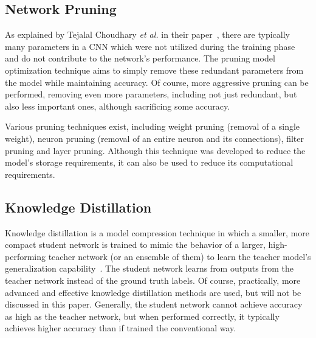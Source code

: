 \subsection{Network Pruning}

As explained by Tejalal Choudhary \textit{et al.} in their
paper~\cite{Choudhary2020}, there are typically many parameters in a CNN which
were not utilized during the training phase and do not contribute to the
network's performance. The pruning model optimization technique aims to simply
remove these redundant parameters from the model while maintaining accuracy. Of
course, more aggressive pruning can be performed, removing even more parameters,
including not just redundant, but also less important ones, although
sacrificing some accuracy.

Various pruning techniques exist, including weight pruning (removal of a single
weight), neuron pruning (removal of an entire neuron and its connections),
filter pruning and layer pruning. Although this technique was developed to
reduce the model's storage requirements, it can also be used to reduce its
computational requirements.


\subsection{Knowledge Distillation}


Knowledge distillation is a model compression technique in which a smaller, more
compact student network is trained to mimic the behavior of a larger,
high-performing teacher network (or an ensemble of them) to learn the teacher
model's generalization capability~\cite{Gou2021}. The student network learns
from outputs from the teacher network instead of the ground truth labels. Of
course, practically, more advanced and effective knowledge distillation methods
are used, but will not be discussed in this paper. Generally, the student
network cannot achieve accuracy as high as the teacher network, but when
performed correctly, it typically achieves higher accuracy than if trained the
conventional way.

